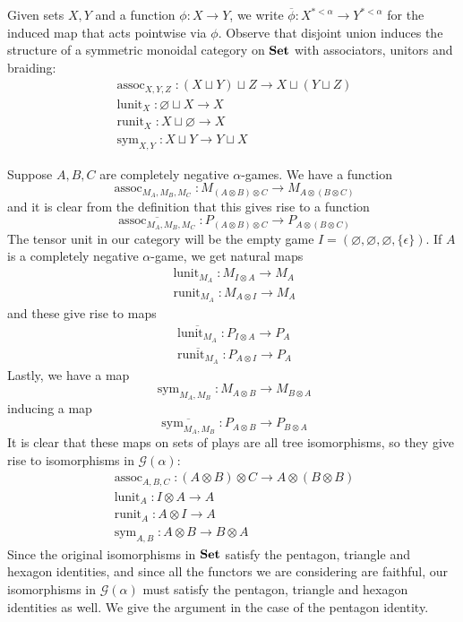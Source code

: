 \documentclass[11pt]{article} %
\theoremstyle{plain} %
\theoremstyle{definition} %
\theoremstyle{note}
\theoremstyle{exercisestyle}
\newcommand{\catname}[1]{{\normalfont\textbf{#1}}}
\newcommand{\Set}{\catname{Set}}
\newcommand*\from{\colon}
\newcommand{\cmap}[3]{#1\from{}#2\to{}#3}
\newcommand{\tensor}{\otimes}
\newcommand{\cprd}{\sqcup}
\newcommand{\G}{\mathcal G}
\newcommand{\emptyplay}{\epsilon}
\DeclareMathOperator{\assoc}{assoc}
\DeclareMathOperator{\lunit}{lunit}
\DeclareMathOperator{\runit}{runit}
\DeclareMathOperator{\sym}{sym}
\newcommand{\braid}{\sym}
\let\emptyset\varnothing
\begin{document}
Given sets $X,Y$ and a function $\cmap{\phi}{X}{Y}$, we write $\overline\phi\from X^{*<\alpha}\to Y^{*<\alpha}$ for the induced map that acts pointwise via $\phi$.  Observe that disjoint union induces the structure of a symmetric monoidal category on $\Set$ with associators, unitors and braiding:
\begin{gather*}
  \assoc_{X,Y,Z}\from (X\cprd Y)\cprd Z\to X\cprd(Y\cprd Z)\\
  \lunit_X\from \emptyset\cprd X\to X\\
  \runit_X\from X\cprd\emptyset\to X\\
  \braid_{X,Y}\from X\cprd Y\to Y\cprd X
\end{gather*}

Suppose $A,B,C$ are completely negative $\alpha$-games.  We have a function
\[
  \assoc_{M_A,M_B,M_C}\from M_{(A\tensor B)\tensor C}\to M_{A\tensor(B\tensor C)}
  \]
and it is clear from the definition that this gives rise to a function
\[
  \overline{\assoc_{M_A,M_B,M_C}}\from P_{(A\tensor B)\tensor C}\to P_{A\tensor(B\tensor C)}
  \]
The tensor unit in our category will be the empty game $I=(\emptyset, \emptyset, \emptyset, \{\emptyplay\})$.  If $A$ is a completely negative $\alpha$-game, we get natural maps
\begin{gather*}
  \lunit_{M_A}\from M_{I\tensor A}\to M_A \\
  \runit_{M_A}\from M_{A\tensor I}\to M_A
\end{gather*}
and these give rise to maps
\begin{gather*}
  \overline{\lunit_{M_A}}\from P_{I\tensor A}\to P_A\\
  \overline{\runit_{M_A}}\from P_{A\tensor I}\to P_A
\end{gather*}
Lastly, we have a map
\[
  \braid_{M_A,M_B}\from M_{A\tensor B}\to M_{B\tensor A}
  \]
inducing a map
\[
  \overline{\braid_{M_A,M_B}}\from P_{A\tensor B}\to P_{B\tensor A}
  \]
It is clear that these maps on sets of plays are all tree isomorphisms, so they give rise to isomorphisms in $\G(\alpha)$:
\begin{gather*}
  \assoc_{A,B,C}\from (A\tensor B)\tensor C\to A\tensor (B\tensor B)\\
  \lunit_A\from I\tensor A\to A\\
  \runit_A\from A\tensor I\to A\\
  \braid_{A,B}\from A\tensor B\to B\tensor A
\end{gather*}
Since the original isomorphisms in $\Set$ satisfy the pentagon, triangle and hexagon identities, and since all the functors we are considering are faithful, our isomorphisms in $\G(\alpha)$ must satisfy the pentagon, triangle and hexagon identities as well.  We give the argument in the case of the pentagon identity.  
\end{document}
